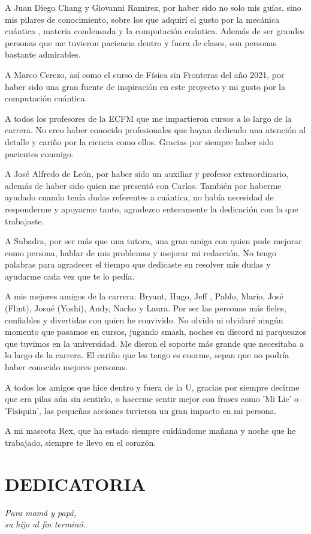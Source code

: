 \documentclass[letterpaper,12pt]{thesisECFM}
\theoremstyle{plain}
\theoremstyle{definition}
\theoremstyle{definition}
\theoremstyle{remark}
\newcommand{\1}{\mathbb{1}}
\begin{document}
A Juan Diego Chang y Giovanni Ramirez, por haber sido no solo mis guías, sino mis pilares de conocimiento, sobre los que adquirí el gusto por la mecánica cuántica , materia condensada y la computación cuántica. Además de ser grandes personas que me tuvieron paciencia dentro y fuera de clases, son personas bastante admirables.

A Marco Cerezo, así como el curso de Física sin Fronteras del año 2021, por haber sido una gran fuente de inspiración en este proyecto y mi gusto por la computación cuántica. 

A todos los profesores de la ECFM que me impartieron cursos a lo largo de la carrera. No creo haber conocido profesionales que hayan dedicado una atención al detalle y cariño por la ciencia como ellos. Gracias por siempre haber sido pacientes conmigo. 

A José Alfredo de León, por haber sido un auxiliar y profesor extraordinario, además de haber sido quien me presentó con Carlos. También por haberme ayudado cuando tenía dudas referentes a cuántica, no había necesidad de responderme y apoyarme tanto, agradezco enteramente la dedicación con la que trabajaste. 

A Subadra, por ser más que una tutora, una gran amiga con quien pude mejorar como persona, hablar de mis problemas y mejorar mi redacción. No tengo palabras para agradecer el tiempo que dedicaste en resolver mis dudas y ayudarme cada vez que te lo pedía. 

A mis mejores amigos de la carrera: Bryant, Hugo, Jeff , Pablo, Mario, José (Flint), Josué (Yoshi), Andy, Nacho y Laura. Por ser las personas más fieles, confiables y divertidas con quien he convivido. No olvido ni olvidaré ningún momento que pasamos en cursos, jugando smash, noches en discord ni parqueazos que tuvimos en la universidad. Me dieron el soporte más grande que necesitaba a lo largo de la carrera. El cariño que les tengo es enorme, sepan que no podría haber conocido mejores personas. 

A todos los amigos que hice dentro y fuera de la U, gracias por siempre decirme que era pilas aún sin sentirlo, o hacerme sentir mejor con frases como 'Mi Lic' o 'Fisiquin', las pequeñas acciones tuvieron un gran impacto en mi persona. 

A mi mascota Rex, que ha estado siempre cuidándome mañana y noche que he trabajado, siempre te llevo en el corazón.
\chapter*{DEDICATORIA}
\begin{flushright}
\textit{Para mamá y papá,} \\
\textit{su hijo al fin terminó.}  \\
\end{flushright}
\end{document}
